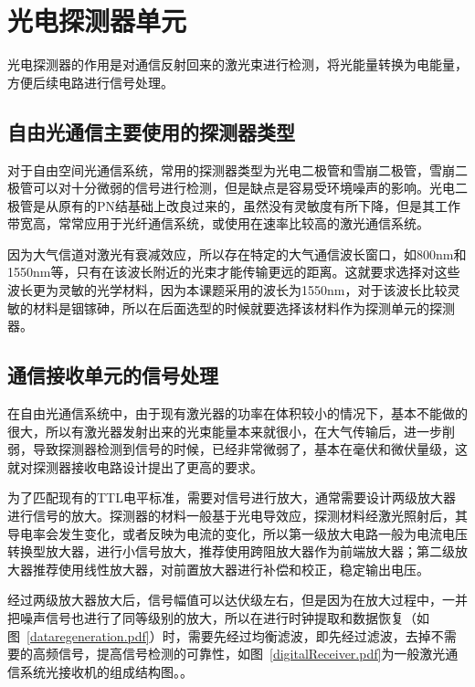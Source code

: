 \chapter{ 光电探测器单元 }
光电探测器的作用是对通信反射回来的激光束进行检测，将光能量转换为电能量，方便后续电路进行信号处理。

\section{自由光通信主要使用的探测器类型}
对于自由空间光通信系统，常用的探测器类型为光电二极管和雪崩二极管，雪崩二极管可以对十分微弱的信号进行检测，但是缺点是容易受环境噪声的影响。光电二极管是从原有的PN结基础上改良过来的，虽然没有灵敏度有所下降，但是其工作带宽高，常常应用于光纤通信系统，或使用在速率比较高的激光通信系统。

因为大气信道对激光有衰减效应，所以存在特定的大气通信波长窗口，如800nm和1550nm等，只有在该波长附近的光束才能传输更远的距离。这就要求选择对这些波长更为灵敏的光学材料，因为本课题采用的波长为1550nm，对于该波长比较灵敏的材料是铟镓砷，所以在后面选型的时候就要选择该材料作为探测单元的探测器。


\section{通信接收单元的信号处理}

在自由光通信系统中，由于现有激光器的功率在体积较小的情况下，基本不能做的很大，所以有激光器发射出来的光束能量本来就很小，在大气传输后，进一步削弱，导致探测器检测到信号的时候，已经非常微弱了，基本在毫伏和微伏量级，这就对探测器接收电路设计提出了更高的要求。

为了匹配现有的TTL电平标准，需要对信号进行放大，通常需要设计两级放大器进行信号的放大。探测器的材料一般基于光电导效应，探测材料经激光照射后，其导电率会发生变化，或者反映为电流的变化，所以第一级放大电路一般为电流\-电压转换型放大器，进行小信号放大，推荐使用跨阻放大器作为前端放大器；第二级放大器推荐使用线性放大器，对前置放大器进行补偿和校正，稳定输出电压。



经过两级放大器放大后，信号幅值可以达伏级左右，但是因为在放大过程中，一并把噪声信号也进行了同等级别的放大，所以在进行时钟提取和数据恢复（如图~\ref{dataregeneration.pdf}）时，需要先经过均衡滤波，即先经过滤波，去掉不需要的高频信号，提高信号检测的可靠性，如图~\ref{digitalReceiver.pdf}为一般激光通信系统光接收机的组成结构图。。



